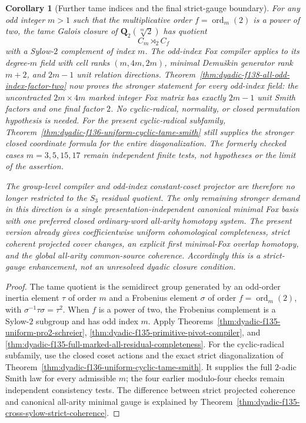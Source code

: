 \documentclass[11pt]{article}
\newtheorem{corollary}[theorem]{Corollary}
\theoremstyle{definition}
\begin{document}
\begin{corollary}[Further tame indices and the final strict-gauge boundary]
\label{cor:dyadic-f135-tame-indices-and-scope}
For any odd
integer $m>1$
such that
the multiplicative
order
$f=\operatorname{ord}_m(2)$
is a power of two,
the tame
Galois closure
of
$\mathbf Q_2(\sqrt[m]2)$
has quotient
\[
C_m\rtimes_2 C_f
\]
with a Sylow-$2$
complement of
index $m$.
The odd-index
Fox compiler
applies to its
degree-$m$
field with
cell ranks
$(m,4m,2m)$,
minimal Demu\v{s}kin
generator rank
$m+2$, and
$2m-1$
unit relation
directions.
Theorem~\ref{thm:dyadic-f138-all-odd-index-factor-two}
now proves the
stronger statement
for \emph{every}
odd-index field:
the uncontracted
$2m\times4m$
marked integer
Fox matrix has
exactly $2m-1$
unit Smith factors
and one final
factor $2$.
No cyclic-radical,
normality, or
closed permutation
hypothesis is needed.
For the present
cyclic-radical
subfamily,
Theorem~\ref{thm:dyadic-f136-uniform-cyclic-tame-smith}
still supplies the
stronger \emph{closed
coordinate formula}
for the entire
diagonalization.
The formerly
checked cases
$m=3,5,15,17$
remain independent
finite tests,
not hypotheses
or the limit
of the assertion.

The group-level
compiler and
odd-index
constant-coset
projector are
therefore no
longer restricted
to the $S_3$
residual quotient.
The only remaining
stronger demand in this direction is
a single presentation-independent
\emph{canonical} minimal Fox basis with
one preferred closed ordinary-word
all-arity homotopy system.
The present version already gives
coefficientwise uniform cohomological
completeness, strict coherent projected
cover changes, an explicit first
minimal-Fox overlap homotopy, and the
global all-arity common-source coherence.
Accordingly this is a strict-gauge
enhancement, not an unresolved
dyadic closure condition.
\end{corollary}

\begin{proof}
The tame
quotient is the
semidirect
group generated
by an odd-order
inertia element
$\tau$ of order
$m$ and a
Frobenius element
$\sigma$ of
order
$f=\operatorname{ord}_m(2)$,
with
$\sigma^{-1}\tau
\sigma=\tau^2$.
When $f$ is a
power of two,
the Frobenius
complement is
a Sylow-$2$
subgroup and
has odd index $m$.
Apply
Theorems~\ref{thm:dyadic-f135-uniform-pro2-schreier},
\ref{thm:dyadic-f135-primitive-pivot-compiler},
and
\ref{thm:dyadic-f135-full-marked-all-residual-completeness}.
For the cyclic-radical
subfamily, use the
closed coset actions
and the exact strict
diagonalization of
Theorem~\ref{thm:dyadic-f136-uniform-cyclic-tame-smith}.
It supplies the
full $2$-adic Smith
law for every
admissible $m$;
the four earlier
modulo-four checks
remain independent
consistency tests.
The difference
between
strict projected
coherence and
canonical all-arity
minimal gauge
is explained by
Theorem~\ref{thm:dyadic-f135-cross-sylow-strict-coherence}.
\end{proof}
\end{document}
